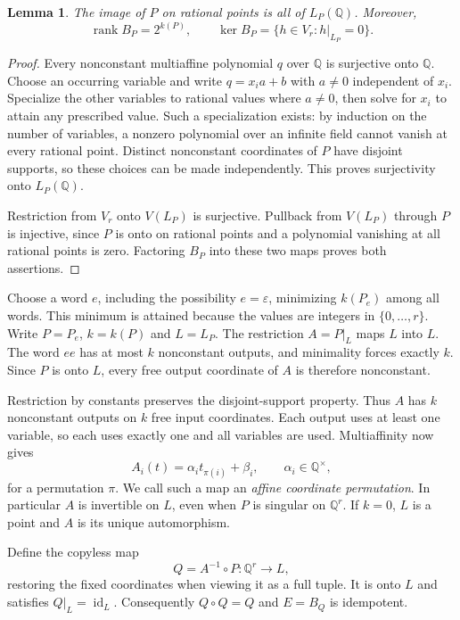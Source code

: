 \documentclass[acmlarge,screen,11pt,nonacm]{acmart}
\newcommand{\Q}{\mathbb{Q}}
\newcommand{\id}{\operatorname{id}}
\newcommand{\eps}{\varepsilon}
\newtheorem{lemma}[theorem]{Lemma}
\theoremstyle{definition}
\begin{document}
\begin{lemma}\label{lem:image}
The image of $P$ on rational points is all of $L_P(\Q)$. Moreover,
\[
 \operatorname{rank}B_P=2^{k(P)},\qquad
 \ker B_P=\{h\in V_r:h|_{L_P}=0\}.
\]
\end{lemma}
\begin{proof}
Every nonconstant multiaffine polynomial $q$ over $\Q$ is surjective onto $\Q$. Choose an occurring variable and write $q=x_i a+b$ with $a\ne0$ independent of $x_i$. Specialize the other variables to rational values where $a\ne0$, then solve for $x_i$ to attain any prescribed value. Such a specialization exists: by induction on the number of variables, a nonzero polynomial over an infinite field cannot vanish at every rational point. Distinct nonconstant coordinates of $P$ have disjoint supports, so these choices can be made independently. This proves surjectivity onto $L_P(\Q)$.

Restriction from $V_r$ onto $V(L_P)$ is surjective. Pullback from $V(L_P)$ through $P$ is injective, since $P$ is onto on rational points and a polynomial vanishing at all rational points is zero. Factoring $B_P$ into these two maps proves both assertions.
\end{proof}

Choose a word $e$, including the possibility $e=\eps$, minimizing $k(P_e)$ among all words. This minimum is attained because the values are integers in $\{0,\ldots,r\}$. Write $P=P_e$, $k=k(P)$ and $L=L_P$. The restriction $A=P|_L$ maps $L$ into $L$. The word $ee$ has at most $k$ nonconstant outputs, and minimality forces exactly $k$. Since $P$ is onto $L$, every free output coordinate of $A$ is therefore nonconstant.

Restriction by constants preserves the disjoint-support property. Thus $A$ has $k$ nonconstant outputs on $k$ free input coordinates. Each output uses at least one variable, so each uses exactly one and all variables are used. Multiaffinity now gives
\begin{equation}\label{eq:affineperm}
 A_i(t)=\alpha_i t_{\pi(i)}+\beta_i,\qquad \alpha_i\in\Q^\times,
\end{equation}
for a permutation $\pi$. We call such a map an \emph{affine coordinate permutation}. In particular $A$ is invertible on $L$, even when $P$ is singular on $\Q^r$. If $k=0$, $L$ is a point and $A$ is its unique automorphism.

Define the copyless map
\[
 Q=A^{-1}\circ P:\Q^r\longrightarrow L,
\]
restoring the fixed coordinates when viewing it as a full tuple. It is onto $L$ and satisfies $Q|_L=\id_L$. Consequently $Q\circ Q=Q$ and $E=B_Q$ is idempotent.
\end{document}
